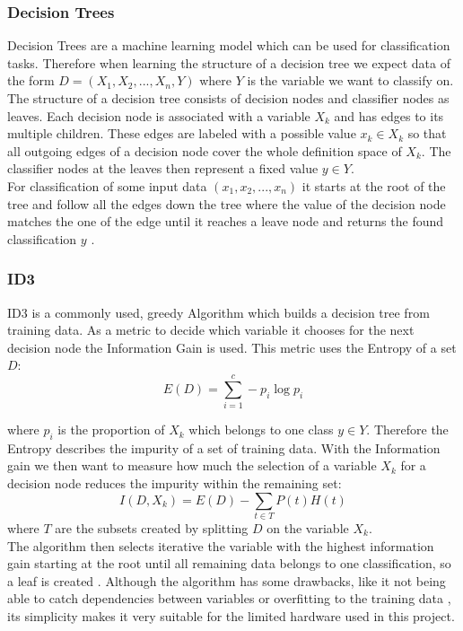 \subsubsection*{Decision Trees}
Decision Trees are a machine learning model which can be used for classification tasks. Therefore when learning the structure  of a decision tree we expect data of the form $D=(X_1,X_2,...,X_n,Y)$ where $Y$ is the variable we want to classify on. The structure of a decision tree consists of decision nodes and classifier nodes as leaves. Each decision node is associated with a variable $X_k$ and has edges to its multiple children. These edges are labeled with a possible value $x_k \in X_k$ so that all outgoing edges of a decision node cover the whole definition space of $X_k$. The classifier nodes at the leaves then represent a fixed value $y \in Y$. \\
For classification of some input data $(x_1,x_2,...,x_n)$ it starts at the root of the tree and follow all the edges down the tree where the value of the decision node matches the one of the edge until it reaches a leave node and returns the found classification $y$ \cite{mitchell1997machine}.

\subsubsection*{ID3}
ID3 is a commonly used, greedy Algorithm which builds a decision tree from training data. As a metric to decide  which variable it chooses for the next decision node the Information Gain is used. This metric uses the Entropy of a set $D$:
\begin{equation*}
    E(D)=\sum_{i=1}^{c} -p_i \log p_i
\end{equation*}

where $p_i$ is the proportion of $X_k$ which belongs to one class $y \in Y$. Therefore the Entropy describes the impurity of a set of training data. With the Information gain we then want to measure how much the selection of a variable $X_k$ for a decision node reduces the impurity within the remaining set:
\begin{equation*}
    I(D,X_k)= E(D) - \sum_{t \in T} P(t) H(t)
\end{equation*}
where $T$ are the subsets created by splitting $D$ on the variable $X_k$. \\
The algorithm then selects iterative the variable with the highest information gain starting at the root until all remaining data belongs to one classification, so a leaf is created \cite{mitchell1997machine}.   
Although the algorithm has some drawbacks, like it not being able to catch dependencies between variables or overfitting to the training data \cite{5991826}, its simplicity makes it very suitable for the limited hardware used in this project.
 

